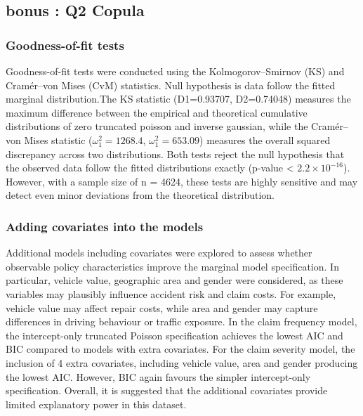 \documentclass[
]{article}
\theoremstyle{plain}
\theoremstyle{definition}
\theoremstyle{remark}
\begin{document}
\newpage

\subsection{bonus : Q2 Copula}\label{bonus-q2-copula}

\subsubsection{Goodness-of-fit tests}\label{goodness-of-fit-tests}

Goodness-of-fit tests were conducted using the Kolmogorov--Smirnov (KS) and Cramér--von Mises (CvM) statistics. Null hypothesis is data follow the fitted marginal distribution.The KS statistic (D1=0.93707, D2=0.74048) measures the maximum difference between the empirical and theoretical cumulative distributions of zero truncated poisson and inverse gaussian, while the Cramér--von Mises statistic (\(\omega_1^2 =1268.4\), \(\omega_1^2=653.09\)) measures the overall squared discrepancy across two distributions. Both tests reject the null hypothesis that the observed data follow the fitted distributions exactly (p-value \textless{} \(2.2 \times 10^{-16}\)). However, with a sample size of n = 4624, these tests are highly sensitive and may detect even minor deviations from the theoretical distribution.

\subsubsection{Adding covariates into the models}\label{adding-covariates-into-the-models}

Additional models including covariates were explored to assess whether observable policy characteristics improve the marginal model specification. In particular, vehicle value, geographic area and gender were considered, as these variables may plausibly influence accident risk and claim costs. For example, vehicle value may affect repair costs, while area and gender may capture differences in driving behaviour or traffic exposure. In the claim frequency model, the intercept-only truncated Poisson specification achieves the lowest AIC and BIC compared to models with extra covariates. For the claim severity model, the inclusion of 4 extra covariates, including vehicle value, area and gender producing the lowest AIC. However, BIC again favours the simpler intercept-only specification. Overall, it is suggested that the additional covariates provide limited explanatory power in this dataset.
\end{document}
